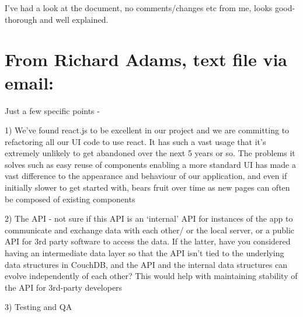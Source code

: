 \documentclass[a4paper,headings=small fontsize=10pt]{scrreprt}
\begin{document}
I've had a look at the document, no comments/changes etc from me, looks
good- thorough and well explained.

\section{From Richard Adams, text file via
email:}

Just a few specific points -

1) We've found react.js to be excellent in our project and we are
committing to refactoring all our UI code to use react. It has such a
vast usage that it's extremely unlikely to get abandoned over the next 5
years or so. The problems it solves such as easy reuse of components
enabling a more standard UI has made a vast difference to the appearance
and behaviour of our application, and even if initially slower to get
started with, bears fruit over time as new pages can often be composed
of existing components

2) The API - not sure if this API is an `internal' API for instances of
the app to communicate and exchange data with each other/ or the local
server, or a public API for 3rd party software to access the data. If
the latter, have you considered having an intermediate data layer so
that the API isn't tied to the underlying data structures in CouchDB,
and the API and the internal data structures can evolve independently of
each other? This would help with maintaining stability of the API for
3rd-party developers

3) Testing and QA
\end{document}
